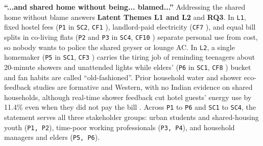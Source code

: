 \documentclass[12pt, a4paper]{article}
\begin{document}
\textbf{``...and shared home without being... blamed...''}
Addressing the shared home without blame answers \textbf{Latent Themes L1 and L2} and \textbf{RQ3}. In \texttt{L1}, fixed hostel fees (\texttt{P1} in \texttt{SC2}, \texttt{CF1} \cite{cf1}), landlord-paid electricity (\texttt{CF7} \cite{cf7}), and equal bill splits in co-living flats (\texttt{P2} and \texttt{P3} in \texttt{SC4}, \texttt{CF10} \cite{cf10}) separate personal use from cost, so nobody wants to police the shared geyser or lounge AC. In \texttt{L2}, a single homemaker (\texttt{P5} in \texttt{SC1}, \texttt{CF3} \cite{cf3}) carries the tiring job of reminding teenagers about 20-minute showers and unattended lights while elders' (\texttt{P6} in \texttt{SC1}, \texttt{CF8} \cite{cf8}) bucket and fan habits are called ``old-fashioned''. Prior household water and shower eco-feedback studies \cite{froehlich2012,tiefenbeck2019} are formative and Western, with no Indian evidence on shared households, although real-time shower feedback cut hotel guests' energy use by 11.4\% even when they did not pay the bill \cite{tiefenbeck2019}. Across \texttt{P1} to \texttt{P6} and \texttt{SC1} to \texttt{SC4}, the statement serves all three stakeholder groups: urban students and shared-housing youth (\texttt{P1, P2}), time-poor working professionals (\texttt{P3, P4}), and household managers and elders (\texttt{P5, P6}).

\end{document}
